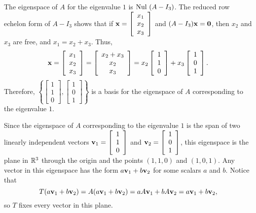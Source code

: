 \begin{example}
The eigenspace of $A$ for the eigenvalue $1$ is $\text{Nul } (A-I_3)$. The reduced row echelon form of $A-I_3$ shows that if $\mathbf{x} = \left[ \begin{array}{c} x_1\\x_2\\x_3 \end{array} \right]$ and $(A-I_3) \mathbf{x} = \mathbf{0}$, then $x_2$ and $x_3$ are free, and $x_1 = x_2+x_3$. Thus, 
\[\mathbf{x} = \left[ \begin{array}{c} x_1\\x_2\\x_3 \end{array} \right] = \left[ \begin{array}{c} x_2+x_3\\ x_2 \\x_3 \end{array} \right] = x_2 \left[ \begin{array}{c} 1\\1\\0 \end{array} \right] + x_3 \left[ \begin{array}{c} 1\\0\\1 \end{array} \right].\]
Therefore, $\left\{\left[ \begin{array}{c} 1\\1\\0 \end{array} \right], \left[ \begin{array}{c} 1\\0\\1 \end{array} \right]\right\}$ is a basis for the eigenspace of $A$ corresponding to the eigenvalue $1$. 

\item Since the eigenspace of $A$ corresponding to the eigenvalue $1$ is the span of two linearly independent vectors $\mathbf{v}_1 = \left[ \begin{array}{r} 1\\1\\0 \end{array} \right]$ and $\mathbf{v}_2 = \left[ \begin{array}{c} 1\\0\\1 \end{array} \right]$, this eigenspace is the plane in $\mathbb{R}^3$ through the origin and the points $(1,1,0)$ and $(1,0,1)$. Any vector in this eigenspace has the form $a \mathbf{v}_1 + b\mathbf{v}_2$ for some scalars $a$ and $b$. Notice that 
\[T(a\mathbf{v}_1+b\mathbf{v}_2) = A(a\mathbf{v}_1+b\mathbf{v}_2) = aA\mathbf{v}_1+bA\mathbf{v}_2 = a\mathbf{v}_1+b\mathbf{v}_2,\]
so $T$ fixes every vector in this plane. 

\ea


\end{example}

